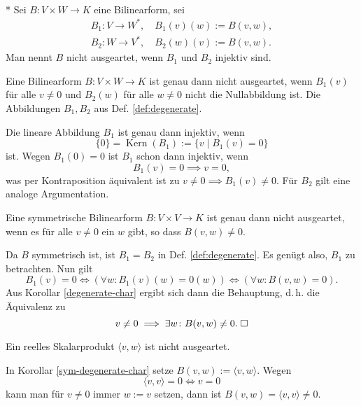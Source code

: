 \begin{Definition}%
\label{def:degenerate}\mbox{}\\*
Sei $B\colon V\times W\to K$ eine Bilinearform, sei
\begin{align*}
B_1\colon V\to W^*,\quad B_1(v)(w):=B(v,w),\\
B_2\colon W\to V^*,\quad B_2(w)(v):=B(v,w).
\end{align*}
Man nennt $B$ nicht ausgeartet, wenn $B_1$ und $B_2$ injektiv sind.
\end{Definition}

\begin{Korollar}\label{degenerate-char}
Eine Bilinearform $B\colon V\times W\to K$ ist genau dann nicht
ausgeartet, wenn $B_1(v)$ für alle $v\ne 0$ und $B_2(w)$ für alle
$w\ne 0$ nicht die Nullabbildung ist. Die Abbildungen $B_1,B_2$
aus Def. \ref{def:degenerate}.
\end{Korollar}
\begin{Beweis}
Die lineare Abbildung $B_1$ ist genau dann injektiv, wenn
\begin{equation}
\{0\} = \operatorname{Kern}(B_1) := \{v\mid B_1(v)=0\}
\end{equation}
ist. Wegen $B_1(0)=0$ ist $B_1$ schon dann injektiv, wenn
\begin{equation}
B_1(v)=0\implies v=0,
\end{equation}
was per Kontraposition äquivalent ist zu $v\ne 0\implies B_1(v)\ne 0$.
Für $B_2$ gilt eine analoge Argumentation.\;\qedsymbol
\end{Beweis}
\begin{Korollar}\label{sym-degenerate-char}
Eine symmetrische Bilinearform $B\colon V\times V\to K$ ist genau
dann nicht ausgeartet, wenn es für alle $v\ne 0$ ein $w$ gibt, so
dass $B(v,w)\ne 0$.
\end{Korollar}
\begin{Beweis}
Da $B$ symmetrisch ist, ist $B_1=B_2$ in Def. \ref{def:degenerate}.
Es genügt also, $B_1$ zu
betrachten. Nun gilt%
\begin{equation}
B_1(v)=0 \iff (\forall w\colon B_1(v)(w)=0(w)) \iff (\forall w\colon B(v,w)=0).
\end{equation}
Aus Korollar \ref{degenerate-char} ergibt sich dann die Behauptung,
d.\,h. die Äquivalenz zu
\begin{equation}
v\ne 0\implies \exists w\colon B(v,w)\ne 0.\;\square
\end{equation}
\end{Beweis}
\begin{Korollar}
Ein reelles Skalarprodukt $\langle v,w\rangle$ ist nicht ausgeartet.
\end{Korollar}
\begin{Beweis}
In Korollar \ref{sym-degenerate-char} setze
$B(v,w):=\langle v,w\rangle$. Wegen
\begin{equation}
\langle v,v\rangle = 0 \iff v=0
\end{equation}
kann man für $v\ne 0$ immer $w:=v$ setzen, dann ist
$B(v,w)=\langle v,v\rangle\ne 0$.\;\qedsymbol
\end{Beweis}

